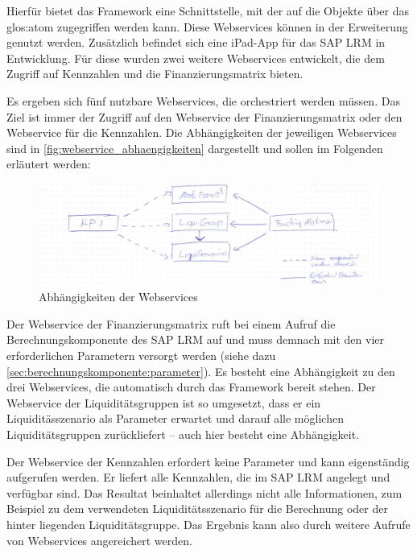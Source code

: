 \begin{onehalfspacing}
Hierfür bietet das Framework eine Schnittstelle, mit der auf die Objekte über das \gls{glos:atom} zugegriffen werden kann. Diese Webservices können in der Erweiterung genutzt werden. Zusätzlich befindet sich eine iPad-App für das SAP LRM in Entwicklung. Für diese wurden zwei weitere Webservices entwickelt, die dem Zugriff auf Kennzahlen und die Finanzierungsmatrix bieten.

Es ergeben sich fünf nutzbare Webservices, die orchestriert werden müssen. Das Ziel ist immer der Zugriff auf den Webservice der Finanzierungsmatrix oder den Webservice für die Kennzahlen. Die Abhängigkeiten der jeweiligen Webservices sind in \vref{fig:webservice_abhaengigkeiten} dargestellt und sollen im Folgenden erläutert werden:

\begin{figure}[h]
\centering
\setlength{\unitlength}{1mm}
\includegraphics[width=15cm]{images/WebService-Abhaengigkeiten.jpg}
\caption{Abhängigkeiten der Webservices\label{fig:webservice_abhaengigkeiten}}
\end{figure} 


Der Webservice der Finanzierungsmatrix ruft bei einem Aufruf die Berechnungskomponente des SAP LRM auf und muss demnach mit den vier erforderlichen Parametern versorgt werden (siehe dazu \vref{sec:berechnungskomponente:parameter}). Es besteht eine Abhängigkeit zu den drei Webservices, die automatisch durch das Framework  bereit stehen. Der Webservice der Liquiditätsgruppen ist so umgesetzt, dass er ein Liquiditässzenario als Parameter erwartet und darauf alle möglichen Liquiditätsgruppen zurückliefert -- auch hier besteht eine Abhängigkeit.

Der Webservice der Kennzahlen erfordert keine Parameter und kann eigenständig aufgerufen werden. Er liefert alle Kennzahlen, die im SAP LRM angelegt und verfügbar sind. Das Resultat beinhaltet allerdings nicht alle Informationen, zum Beispiel zu dem verwendeten Liquiditätsszenario für die Berechnung oder der hinter liegenden Liquiditätsgruppe. Das Ergebnis kann also durch weitere Aufrufe von Webservices angereichert werden.


\end{onehalfspacing}
